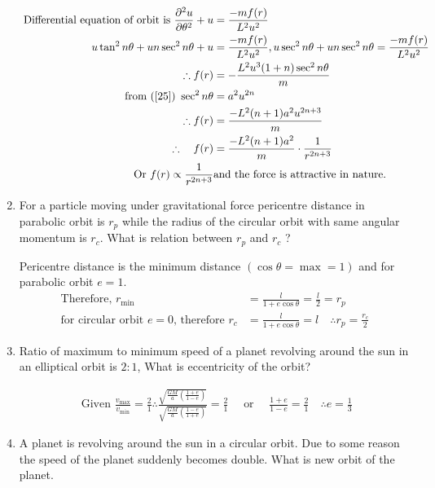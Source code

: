 \begin{enumerate}
\begin{answer}
\begin{align}
	\text{ Differential equation of orbit is }\frac{\partial^{2} u}{\partial \theta^{2}}+u&=\frac{-m f(r)}{L^{2} u^{2}}\notag\\
	u \tan ^{2} n \theta+u n \sec ^{2} n \theta+u&=\frac{-m f(r)}{L^{2} u^{2}}, u \sec ^{2} n \theta+u n \sec ^{2} n \theta=\frac{-m f(r)}{L^{2} u^{2}}\notag\\
	\therefore f(r)&=-\frac{L^{2} u^{3}(1+n) \sec ^{2} n \theta}{m}\notag\\
	\text{from (\ref{25}) }\sec ^{2} n \theta&=a^{2} u^{2 n}\notag\\
	\therefore f(r)&=\frac{-L^{2}(n+1) a^{2} u^{2 n+3}}{m}\notag\\
	\therefore \quad f(r)&=\frac{-L^{2}(n+1) a^{2}}{m} \cdot \frac{1}{r^{2 n+3}}\notag\\
	\text{Or }
	f(r) \propto \frac{1}{r^{2 n+3}}&
	\text{and the force is attractive in nature.}\notag
	\end{align}
\end{answer}
	\item  For a particle moving under gravitational force pericentre distance in parabolic orbit is $r_{p}$ while the radius of the circular orbit with same angular momentum is $r_{c}$. What is relation between $r_{p}$ and $r_c$ ?
\begin{answer}
	Pericentre distance is the minimum distance $(\cos \theta=\max =1)$ and for parabolic orbit $e=1 .$
	\begin{align*}
	\text{Therefore, }r_{\min }&=\frac{l}{1+e \cos \theta}=\frac{l}{2}=r_{p}\\
	\text{for circular orbit $e=0$, therefore }r_{c}&=\frac{l}{1+e \cos \theta}=l \quad \therefore r_{p}=\frac{r_{c}}{2}
	\end{align*}
\end{answer}
\item  Ratio of maximum to minimum speed of a planet revolving around the sun in an elliptical orbit is $2: 1$, What is eccentricity of the orbit?
\begin{answer}
	\begin{align*}
	\text{	Given }\frac{v_{\max }}{v_{\min }}=\frac{2}{1} \therefore \frac{\sqrt{\frac{G M}{a}\left(\frac{1+e}{1-e}\right)}}{\sqrt{\frac{G M}{a}\left(\frac{1-e}{1+e}\right)}}=\frac{2}{1} \quad\text{ or }\quad \frac{1+e}{1-e}=\frac{2}{1} \quad \therefore e=\frac{1}{3}
	\end{align*}
\end{answer}
\item  A planet is revolving around the sun in a circular orbit. Due to some reason the speed of the planet suddenly becomes double. What is new orbit of the planet.

\end{enumerate}
